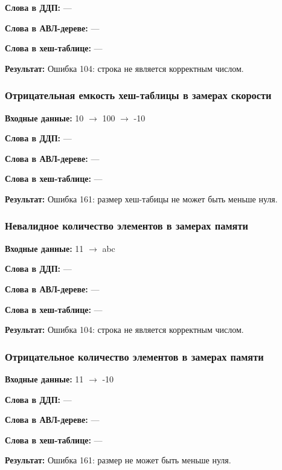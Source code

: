 \documentclass[a4paper,12pt]{extarticle}
\begin{document}
\textbf{Слова в ДДП: }
---

\textbf{Слова в АВЛ-дереве: }
---

\textbf{Слова в хеш-таблице: }
---

\textbf{Результат: }
Ошибка 104: строка не является корректным числом.


\subsubsection{Отрицательная емкость хеш-таблицы в замерах скорости}

\textbf{Входные данные: }
10 $\rightarrow$ 100 $\rightarrow$ -10

\textbf{Слова в ДДП: }
---

\textbf{Слова в АВЛ-дереве: }
---

\textbf{Слова в хеш-таблице: }
---

\textbf{Результат: }
Ошибка 161: размер хеш-табицы не может быть меньше нуля.



\subsubsection{Невалидное количество элементов в замерах памяти}

\textbf{Входные данные: }
11 $\rightarrow$ abc

\textbf{Слова в ДДП: }
---

\textbf{Слова в АВЛ-дереве: }
---

\textbf{Слова в хеш-таблице: }
---

\textbf{Результат: }
Ошибка 104: строка не является корректным числом.


\subsubsection{Отрицательное количество элементов в замерах памяти}

\textbf{Входные данные: }
11 $\rightarrow$ -10

\textbf{Слова в ДДП: }
---

\textbf{Слова в АВЛ-дереве: }
---

\textbf{Слова в хеш-таблице: }
---

\textbf{Результат: }
Ошибка 161: размер не может быть меньше нуля.

\end{document}
